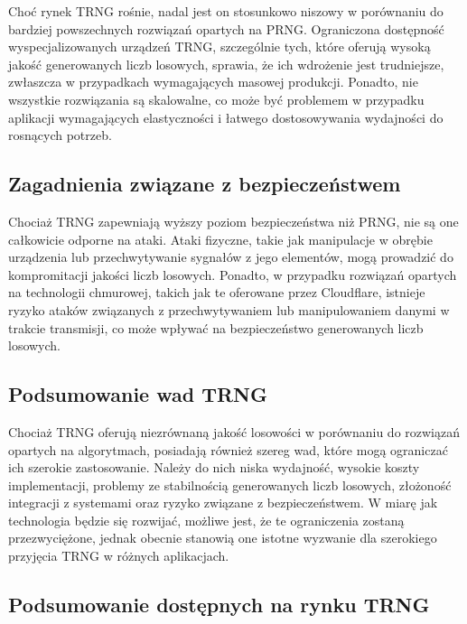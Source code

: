 Choć rynek TRNG rośnie, nadal jest on stosunkowo niszowy w porównaniu do bardziej powszechnych rozwiązań opartych na PRNG. Ograniczona dostępność wyspecjalizowanych urządzeń TRNG, szczególnie tych, które oferują wysoką jakość generowanych liczb losowych, sprawia, że ich wdrożenie jest trudniejsze, zwłaszcza w przypadkach wymagających masowej produkcji. Ponadto, nie wszystkie rozwiązania są skalowalne, co może być problemem w przypadku aplikacji wymagających elastyczności i łatwego dostosowywania wydajności do rosnących potrzeb.

\subsection{Zagadnienia związane z bezpieczeństwem}

Chociaż TRNG zapewniają wyższy poziom bezpieczeństwa niż PRNG, nie są one całkowicie odporne na ataki. Ataki fizyczne, takie jak manipulacje w obrębie urządzenia lub przechwytywanie sygnałów z jego elementów, mogą prowadzić do kompromitacji jakości liczb losowych. Ponadto, w przypadku rozwiązań opartych na technologii chmurowej, takich jak te oferowane przez Cloudflare, istnieje ryzyko ataków związanych z przechwytywaniem lub manipulowaniem danymi w trakcie transmisji, co może wpływać na bezpieczeństwo generowanych liczb losowych.

\subsection{Podsumowanie wad TRNG}

Chociaż TRNG oferują niezrównaną jakość losowości w porównaniu do rozwiązań opartych na algorytmach, posiadają również szereg wad, które mogą ograniczać ich szerokie zastosowanie. Należy do nich niska wydajność, wysokie koszty implementacji, problemy ze stabilnością generowanych liczb losowych, złożoność integracji z systemami oraz ryzyko związane z bezpieczeństwem. W miarę jak technologia będzie się rozwijać, możliwe jest, że te ograniczenia zostaną przezwyciężone, jednak obecnie stanowią one istotne wyzwanie dla szerokiego przyjęcia TRNG w różnych aplikacjach.

\subsection{Podsumowanie dostępnych na rynku TRNG}